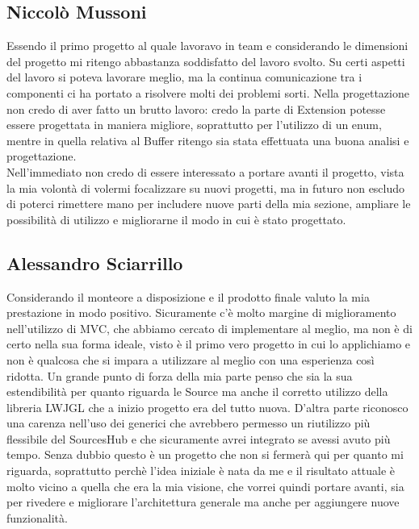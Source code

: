 \documentclass[a4paper,12pt]{report}
\begin{document}
\subsection*{Niccolò Mussoni}
Essendo il primo progetto al quale lavoravo in team e considerando le dimensioni del progetto mi ritengo abbastanza soddisfatto del lavoro svolto. Su certi aspetti del lavoro si poteva lavorare meglio, ma la continua comunicazione tra i componenti ci ha portato a risolvere molti dei problemi sorti. Nella progettazione non credo di aver fatto un brutto lavoro: credo la parte di Extension potesse essere progettata in maniera migliore, soprattutto per l'utilizzo di un enum, mentre in quella relativa al Buffer ritengo sia stata effettuata una buona analisi e progettazione. 
\\Nell'immediato non credo di essere interessato a portare avanti il progetto, vista la mia volontà di volermi focalizzare su nuovi progetti, ma in futuro non escludo di poterci rimettere mano per includere nuove parti della mia sezione, ampliare le possibilità di utilizzo e migliorarne il modo in cui è stato progettato.
\subsection*{Alessandro Sciarrillo}
Considerando il monteore a disposizione e il prodotto finale valuto la mia prestazione in modo positivo.
Sicuramente c'è molto margine di miglioramento nell'utilizzo di MVC, che abbiamo cercato di implementare al meglio, ma non è di certo nella sua forma ideale, visto è il primo vero progetto in cui lo applichiamo e non è qualcosa che si impara a utilizzare al meglio con una esperienza così ridotta. Un grande punto di forza della mia parte penso che sia la sua estendibilità per quanto riguarda le Source ma anche il corretto utilizzo della libreria LWJGL che a inizio progetto era del tutto nuova. D'altra parte riconosco una carenza nell'uso dei generici che avrebbero permesso un riutilizzo più flessibile del SourcesHub e che sicuramente avrei integrato se avessi avuto più tempo.
Senza dubbio questo è un progetto che non si fermerà qui per quanto mi riguarda, soprattutto perchè l'idea iniziale è nata da me e il risultato attuale è molto vicino a quella che era la mia visione, che vorrei quindi portare avanti, sia per rivedere e migliorare l'architettura generale ma anche per aggiungere nuove funzionalità.
\end{document}

